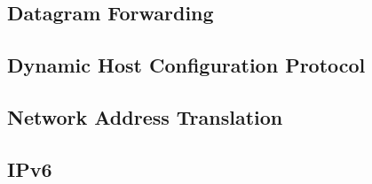 \subsection{Datagram Forwarding}

\newpage


\subsection{Dynamic Host Configuration Protocol}

\subsection{Network Address Translation}

\subsection{IPv6}
